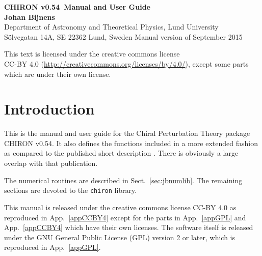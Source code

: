 \documentclass[12pt,a4paper]{article}
\newcommand{\mytt}[1]{\texttt{#1}}
\newcommand{\chironversion}{v0.54}
\newcommand{\versiondate}{September 2015}
\begin{document}
\begin{titlepage}
\setcounter{page}{-1} %
\phantom{p}
\vfill
\begin{center}
{\large \bf CHIRON \chironversion\ Manual and User Guide}
\\[1cm]
{\bf Johan Bijnens}\\[0.5cm]
{Department of Astronomy and Theoretical Physics, Lund University\\
Sölvegatan 14A, SE 22362 Lund, Sweden}
\vfill
Manual version of \versiondate
\vfill
\end{center}
\begin{abstract}
This manual and user guide describes the classes and functions contained
in the ChPT program collection \textsc{CHIRON}\chironversion\ which includes
the numerical library \mytt{jbnumlib} and the ChPT
routine library \mytt{chiron}.
\end{abstract}
\vfill
\noindent This text is licensed under the creative commons license\\CC-BY 4.0
(\url{http://creativecommons.org/licenses/by/4.0/}), except some parts which are
under their own license.
\end{titlepage}

\tableofcontents

\section{Introduction}
\label{introduction}

This is the manual and user guide for the Chiral Perturbation Theory
package \textsc{CHIRON} \chironversion. It also defines the functions
included in a more extended fashion as compared to the
published short description \cite{Bijnens:2014gsa}. There is obviously
a large overlap with that publication.

The numerical routines are described in Sect.~\ref{sec:jbnumlib}.
The remaining sections are devoted to the \mytt{chiron} library.

This manual is released under the creative commons license CC-BY 4.0
\cite{CClicense}
as reproduced in App.~\ref{appCCBY4} except for the parts
in App.~\ref{appGPL} and App.~\ref{appCCBY4} which have their own licenses.
The software itself is released under the GNU General Public License (GPL)
version 2 or later, which is reproduced in App.~\ref{appGPL}.
\end{document}
